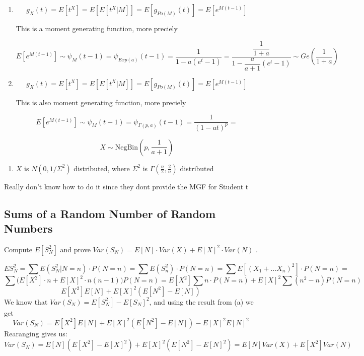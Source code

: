\begin{enumerate}[label=(\alph*)]
\solution
\begin{enumerate}
    \item 
    \[
        g_X (t) = E \left[ t^X \right] = E \left[ E \left[ t^X |  M \right] \right] = E \left[ g_{Po(M)}(t)\right] = E\left[e^{M(t-1)}\right]
    \]

    This is a moment generating function, more preciely

    \[
        E\left[e^{M(t-1)}\right] \sim \psi_{M}(t-1) = \psi_{Exp(a)}(t-1) = \frac{1}{1-a(e^t-1)} = \frac{\dfrac{1}{1+a}}{1-\dfrac{a}{a+1}(e^t-1)} \sim Ge(\dfrac{1}{1+a})
    \]

 \item
    
    \[
        g_X (t) = E \left[ t^X \right] = E \left[ E \left[ t^X |  M \right] \right] = E \left[ g_{Po(M)}(t)\right] = E\left[e^{M(t-1)}\right]
    \]

    This is also moment generating function, more preciely

    \[
        E\left[e^{M(t-1)}\right] \sim \psi_{M}(t-1) = \psi_{\Gamma(p,a)}(t-1) = \frac{1}{(1-at)^p} =   \]

    \[
X \sim \text{NegBin}\left(p, \frac{1}{a+1}\right)
\]
\end{enumerate}


\exercise 

\begin{enumerate}
    \item $X$ is $N(0,1/ \Sigma^2)$ distributed, where $\Sigma^2$ is $\Gamma(\frac{n}{2} , \frac{2}{n}) $ distributed
\end{enumerate}


\solution
Really don't know how to do it since they dont provide the MGF for Student t



\subsection{Sums of a Random Number of Random Numbers}

\exercise
Compute $E[S_N^2] $ and prove $Var(S_N) = E[N] \cdot Var(X) + E[X]^2 \cdot Var(N)$ .

\solution

\[
    E S_N^2 = \sum E(S_N^2 | N = n) \cdot P(N=n) = \sum E(S_n^2) \cdot P(N=n) = \sum E[(X_1 + ... X_n)^2] \cdot P(N=n) =
\]
\[
    \sum \biggl(E[X^2] \cdot  n + E[X]^2 \cdot n(n-1) \biggr) P(N=n) = E[X^2]\sum n \cdot P(N=n) + E[X]^2 \sum (n^2-n)P(N=n)
\]
\[
  E[X^2]E[N]  + E[X]^2(E[N^2] - E[N])
\]
We know that \(Var(S_N) = E[S_N^2]-E[S_N]^2\), and using the result from (a) we get
\[
    Var(S_N) = E[X^2]E[N]  +E[X]^2(E[N^2] - E[N]) - E[X]^2 E[N]^2
\]
Rearanging gives us:
\[
    Var(S_N) = E[N](E[X^2] - E[X]^2)  +E[X]^2(E[N^2] - E[N]^2) = E[N]Var(X)+E[X^2]Var(N) 
\]


\end{enumerate}
